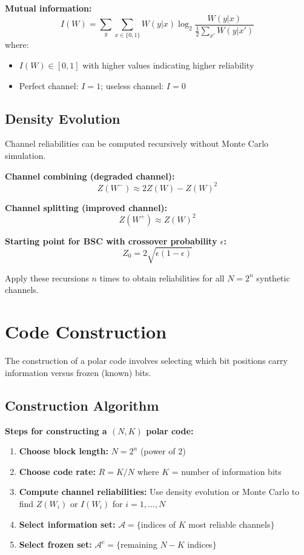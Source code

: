 \textbf{Mutual information:}
\begin{equation}
I(W) = \sum_{y} \sum_{x \in \{0,1\}} W(y|x) \log_2\frac{W(y|x)}{\frac{1}{2}\sum_{x'} W(y|x')}
\end{equation}
where:
\begin{itemize}
\item $I(W) \in [0, 1]$ with higher values indicating higher reliability
\item Perfect channel: $I = 1$; useless channel: $I = 0$
\end{itemize}

\subsection{Density Evolution}

Channel reliabilities can be computed recursively without Monte Carlo simulation.

\textbf{Channel combining (degraded channel):}
\begin{equation}
Z(W^-) \approx 2Z(W) - Z(W)^2
\end{equation}

\textbf{Channel splitting (improved channel):}
\begin{equation}
Z(W^+) \approx Z(W)^2
\end{equation}

\textbf{Starting point for BSC with crossover probability $\epsilon$:}
\begin{equation}
Z_0 = 2\sqrt{\epsilon(1-\epsilon)}
\end{equation}

Apply these recursions $n$ times to obtain reliabilities for all $N = 2^n$ synthetic channels.

\section{Code Construction}

The construction of a polar code involves selecting which bit positions carry information versus frozen (known) bits.

\subsection{Construction Algorithm}

\textbf{Steps for constructing a $(N, K)$ polar code:}

\begin{enumerate}
\item \textbf{Choose block length:} $N = 2^n$ (power of 2)
\item \textbf{Choose code rate:} $R = K/N$ where $K$ = number of information bits
\item \textbf{Compute channel reliabilities:} Use density evolution or Monte Carlo to find $Z(W_i)$ or $I(W_i)$ for $i = 1, \ldots, N$
\item \textbf{Select information set:} $\mathcal{A} = \{$indices of $K$ most reliable channels$\}$
\item \textbf{Select frozen set:} $\mathcal{A}^c = \{$remaining $N-K$ indices$\}$
\end{enumerate}

